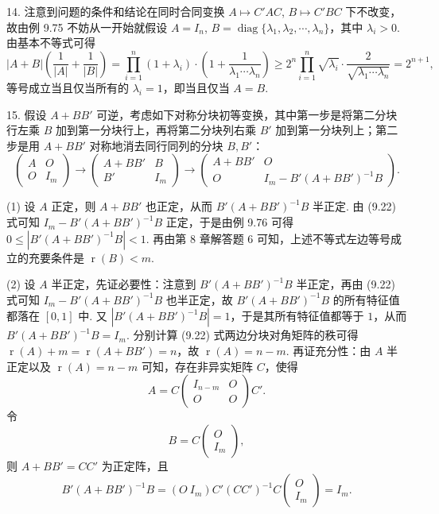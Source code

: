 \documentclass[UTF8,12pt,a4paper,fontset=fandol]{ctexart}
\begin{document}
14. 注意到问题的条件和结论在同时合同变换 $A\mapsto C'AC$, $B\mapsto C'BC$ 下不改变，故由例 9.75 不妨从一开始就假设 $A=I_n$, $B=\operatorname{diag}\{\lambda_1,\lambda_2,\cdots,\lambda_n\}$，其中 $\lambda_i>0$. 由基本不等式可得
\[
|A+B|\left(\frac{1}{|A|}+\frac{1}{|B|}\right)
=\prod_{i=1}^n(1+\lambda_i)\cdot\left(1+\frac{1}{\lambda_1\cdots\lambda_n}\right)
\ge 2^n\prod_{i=1}^n\sqrt{\lambda_i}\cdot\frac{2}{\sqrt{\lambda_1\cdots\lambda_n}}=2^{n+1},
\]
等号成立当且仅当所有的 $\lambda_i=1$，即当且仅当 $A=B$.

15. 假设 $A+BB'$ 可逆，考虑如下对称分块初等变换，其中第一步是将第二分块行左乘 $B$ 加到第一分块行上，再将第二分块列右乘 $B'$ 加到第一分块列上；第二步是用 $A+BB'$ 对称地消去同行同列的分块 $B,B'$：
\[
\begin{pmatrix}
A&O\\
O&I_m
\end{pmatrix}
\to
\begin{pmatrix}
A+BB'&B\\
B'&I_m
\end{pmatrix}
\to
\begin{pmatrix}
A+BB'&O\\
O&I_m-B'(A+BB')^{-1}B
\end{pmatrix}.
\tag{9.22}
\]

(1) 设 $A$ 正定，则 $A+BB'$ 也正定，从而 $B'(A+BB')^{-1}B$ 半正定. 由 (9.22) 式可知 $I_m-B'(A+BB')^{-1}B$ 正定，于是由例 9.76 可得 $0\le |B'(A+BB')^{-1}B|<1$. 再由第 8 章解答题 6 可知，上述不等式左边等号成立的充要条件是 $\operatorname{r}(B)<m$.

(2) 设 $A$ 半正定，先证必要性：注意到 $B'(A+BB')^{-1}B$ 半正定，再由 (9.22) 式可知 $I_m-B'(A+BB')^{-1}B$ 也半正定，故 $B'(A+BB')^{-1}B$ 的所有特征值都落在 $[0,1]$ 中. 又 $|B'(A+BB')^{-1}B|=1$，于是其所有特征值都等于 $1$，从而 $B'(A+BB')^{-1}B=I_m$. 分别计算 (9.22) 式两边分块对角矩阵的秩可得 $\operatorname{r}(A)+m=\operatorname{r}(A+BB')=n$，故 $\operatorname{r}(A)=n-m$. 再证充分性：由 $A$ 半正定以及 $\operatorname{r}(A)=n-m$ 可知，存在非异实矩阵 $C$，使得
\[
A=C\begin{pmatrix}
I_{n-m}&O\\
O&O
\end{pmatrix}C'.
\]
令
\[
B=C\begin{pmatrix}
O\\
I_m
\end{pmatrix},
\]
则 $A+BB'=CC'$ 为正定阵，且
\[
B'(A+BB')^{-1}B=(O\ I_m)C'(CC')^{-1}C\begin{pmatrix}
O\\
I_m
\end{pmatrix}=I_m.
\]
\end{document}
